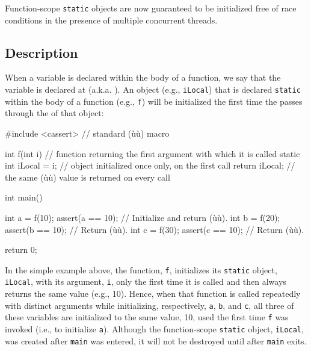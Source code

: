 

Function-scope \lstinline!static! objects are now guaranteed to be
initialized free of race conditions in the presence
of multiple concurrent threads.

\subsection[Description]{Description}\label{description-functionstatic}

When a variable is declared within the body of a function, we say that
the variable is declared at  (a.k.a.
). An object (e.g., \lstinline!iLocal!) that is
declared \lstinline!static! within the body of a function (e.g.,
\lstinline!f!) will be initialized the first time the  passes through the  of that object:

\begin{emcppslisting}
#include <cassert>  // standard (ù{}ù) macro

int f(int i) // function returning the first argument with which it is called
{
    static int iLocal = i;  // object initialized once only, on the first call
    return iLocal;          // the same (ù{}ù) value is returned on every call
}

int main()
{
    int a = f(10);  assert(a == 10);  // Initialize and return (ù{}ù).
    int b = f(20);  assert(b == 10);  // Return (ù{}ù).
    int c = f(30);  assert(c == 10);  // Return (ù{}ù).

    return 0;
}
\end{emcppslisting}

\noindent In the simple example above, the function, \lstinline!f!, initializes its
\lstinline!static! object, \lstinline!iLocal!, with its argument, \lstinline!i!, only
the first time it is called and then always returns the same value
(e.g., 10). Hence, when that function is called repeatedly with distinct
arguments while initializing, respectively, \lstinline!a!, \lstinline!b!, and
\lstinline!c!, all three of these variables are initialized to the same
value, 10, used the first time \lstinline!f! was invoked (i.e., to
initialize \lstinline!a!). Although the function-scope \lstinline!static!
object, \lstinline!iLocal!, was created after \lstinline!main! was entered, it
will not be destroyed until after \lstinline!main! exits.

